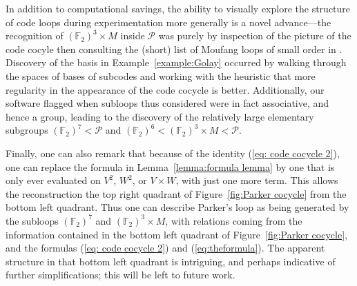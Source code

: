 \documentclass{article}
\theoremstyle{plain}
\theoremstyle{definition}
\def \cP {\mathcal{P}}
\def \FF {\mathbb{F}}
\begin{document}
In addition to computational savings, the ability to visually explore the structure of code loops during experimentation more generally is a novel advance---the recognition of $(\FF_2)^3\times M$ inside $\cP$ was purely by inspection of the picture of the code cocyle then consulting the (short) list of Moufang loops of small order in \cite{Chein}.
Discovery of the basis in Example~\ref{example:Golay} occurred by walking through the spaces of bases of subcodes and working with the heuristic that more regularity in the appearance of the code cocycle is better.
Additionally, our software flagged when subloops thus considered were in fact associative, and hence a group, leading to the discovery of the relatively large elementary subgroups $(\FF_2)^7 < \cP$ and $(\FF_2)^6 < (\FF_2)^3\times M < \cP$. 

Finally, one can also remark that because of the identity (\ref{eq: code cocycle 2}), one can replace the formula in Lemma~\ref{lemma:formula lemma} by one that is only ever evaluated on $V^2$, $W^2$, or $V\times W$, with just one more term. This allows the reconstruction the top right quadrant of Figure~\ref{fig:Parker cocycle} from the bottom left quadrant. 
Thus one can describe Parker's loop as being generated by the subloops $(\FF_2)^7$ and $(\FF_2)^3\times M$, with relations coming from the information contained in the bottom left quadrant of Figure~\ref{fig:Parker cocycle}, and the formulas (\ref{eq: code cocycle 2}) and (\ref{eq:theformula}).
The apparent structure in that bottom left quadrant is intriguing, and perhaps indicative of further simplifications; this will be left to future work.
\end{document}
